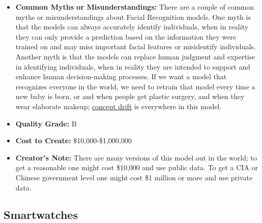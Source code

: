 \begin{itemize}
    \item \textbf{Common Myths or Misunderstandings:} There are a couple of common myths or misunderstandings about Facial Recognition models. One myth is that the models can always accurately identify individuals, when in reality they can only provide a prediction based on the information they were trained on and may miss important facial features or misidentify individuals. Another myth is that the models can replace human judgment and expertise in identifying individuals, when in reality they are intended to support and enhance human decision-making processes. If we want a model that recognizes everyone in the world, we need to retrain that model every time a new baby is born, or and when people get plastic surgery, and when they wear elaborate makeup; \hyperref[sec:drift]{concept drift} is everywhere in this model.  
    \item \textbf{Quality Grade:} B
    \item \textbf{Cost to Create:} \$10,000-\$1,000,000
    \item \textbf{Creator's Note:} There are many versions of this model out in the world; to get a reasonable one might cost \$10,000 and use public data. To get a CIA or Chinese government level one might cost \$1 million or more and use private data. 
\end{itemize}

\subsection{Smartwatches} 

